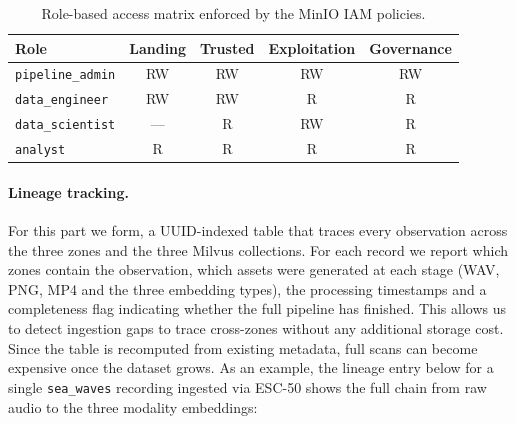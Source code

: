 \documentclass[11pt,a4paper]{article}
\begin{document}
\begin{table}[H]
\centering
\small
\begin{tabular}{@{}lcccc@{}}
\toprule
\textbf{Role} & \textbf{Landing} & \textbf{Trusted} & \textbf{Exploitation} & \textbf{Governance}\\
\midrule
\texttt{pipeline\_admin} & RW & RW & RW & RW\\
\texttt{data\_engineer} & RW & RW & R & R\\
\texttt{data\_scientist} & --- & R & RW & R\\
\texttt{analyst} & R & R & R & R\\
\bottomrule
\end{tabular}
\caption{Role-based access matrix enforced by the MinIO IAM policies.}
\label{tab:rbac}
\end{table}

\paragraph{Lineage tracking.}
For this part we form, a UUID-indexed table that traces every observation across the three zones and the three Milvus collections. For each record we report which zones contain the observation, which assets were generated at each stage (WAV, PNG, MP4 and the three embedding types), the processing timestamps and a completeness flag indicating whether the full pipeline has finished. This allows us to detect ingestion gaps to trace cross-zones without any additional storage cost. Since the table is recomputed from existing metadata, full scans can become expensive once the dataset grows. As an example, the lineage entry below for a single \texttt{sea\_waves} recording ingested via ESC-50 shows the full chain from raw audio to the three modality embeddings:
\end{document}
